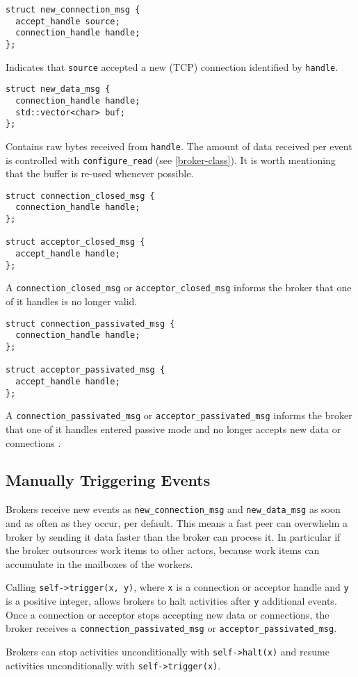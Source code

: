 \begin{lstlisting}
struct new_connection_msg {
  accept_handle source;
  connection_handle handle;
};
\end{lstlisting}

Indicates that \lstinline^source^ accepted a new (TCP) connection identified by \lstinline^handle^.

\begin{lstlisting}
struct new_data_msg {
  connection_handle handle;
  std::vector<char> buf;
};
\end{lstlisting}

Contains raw bytes received from \lstinline^handle^. The amount of data received per event is controlled with \lstinline^configure_read^ (see \ref{broker-class}).
It is worth mentioning that the buffer is re-used whenever possible.

\begin{lstlisting}
struct connection_closed_msg {
  connection_handle handle;
};

struct acceptor_closed_msg {
  accept_handle handle;
};
\end{lstlisting}

A \lstinline^connection_closed_msg^ or \lstinline^acceptor_closed_msg^ informs the broker that one of it handles is no longer valid.

\begin{lstlisting}
struct connection_passivated_msg {
  connection_handle handle;
};

struct acceptor_passivated_msg {
  accept_handle handle;
};
\end{lstlisting}

A \lstinline^connection_passivated_msg^ or \lstinline^acceptor_passivated_msg^ informs the broker that one of it handles entered passive mode and no longer accepts new data or connections .

\subsection{Manually Triggering Events \experimental}
\label{trigger}

Brokers receive new events as \lstinline^new_connection_msg^ and \lstinline^new_data_msg^ as soon and as often as they occur, per default. This means a fast peer can overwhelm a broker by sending it data faster than the broker can process it. In particular if the broker outsources work items to other actors, because work items can accumulate in the mailboxes of the workers.

Calling \lstinline^self->trigger(x, y)^, where \lstinline^x^ is a connection or acceptor handle and \lstinline^y^ is a positive integer, allows brokers to halt activities after \lstinline^y^ additional events. Once a connection or acceptor stops accepting new data or connections, the broker receives a \lstinline^connection_passivated_msg^ or \lstinline^acceptor_passivated_msg^.

Brokers can stop activities unconditionally with \lstinline^self->halt(x)^ and resume activities unconditionally with \lstinline^self->trigger(x)^.
